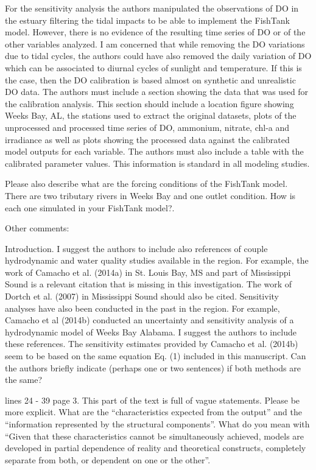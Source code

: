 \documentclass[letterpaper,12pt]{article}\usepackage[]{graphicx}\usepackage[]{color}
\begin{document}
For the sensitivity analysis the authors manipulated the observations of DO in the estuary filtering the tidal impacts to be able to implement the FishTank model. However, there is no evidence of the resulting time series of DO or of the other variables analyzed. I am concerned that while removing the DO variations due to tidal cycles, the authors could have also removed the daily variation of DO which can be associated to diurnal cycles of sunlight and temperature. If this is the case, then the DO calibration is based almost on synthetic and unrealistic DO data. The authors must include a section showing the data that was used for the calibration analysis. This section should include a location figure showing Weeks Bay, AL, the stations used to extract the original datasets, plots of the unprocessed and processed time series of DO, ammonium, nitrate, chl-a and irradiance as well as plots showing the processed data against the calibrated model outputs for each variable. The authors must also include a table with the calibrated parameter values. This information is standard in all modeling studies.

Please also describe what are the forcing conditions of the FishTank model. There are two tributary rivers in Weeks Bay and one outlet condition. How is each one simulated in your FishTank model?.

Other comments:

Introduction. I suggest the authors to include also references of couple hydrodynamic and water quality studies available in the region. For example, the work of Camacho et al. (2014a) in St. Louis Bay, MS and part of Mississippi Sound is a relevant citation that is missing in this investigation. The work of Dortch et al. (2007) in Mississippi Sound should also be cited. Sensitivity analyses have also been conducted in the past in the region. For example, Camacho et al (2014b) conducted an uncertainty and sensitivity analysis of a hydrodynamic model of Weeks Bay Alabama. I suggest the authors to include these references. The sensitivity estimates provided by Camacho et al. (2014b) seem to be based on the same equation Eq. (1) included in this manuscript. Can the authors briefly indicate (perhaps one or two sentences) if both methods are the same?

lines 24 - 39 page 3. This part of the text is full of vague statements. Please be more explicit. What are the ``characteristics expected from the output'' and the ``information represented by the structural components''. What do you mean with ``Given that these characteristics cannot be simultaneously achieved, models are developed in partial dependence of reality and theoretical constructs, completely separate from both, or dependent on one or the other''.
\end{document}
